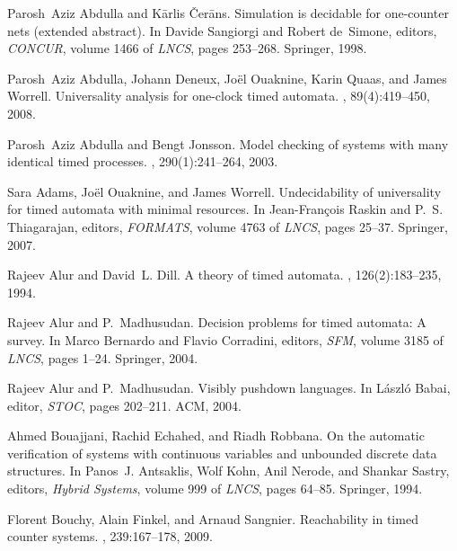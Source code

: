 \documentclass{CSML}
\theoremstyle{plain}\newtheorem{theorem}[thm]{Theorem}
\theoremstyle{plain}\newtheorem{corollary}[thm]{Corollary}
\theoremstyle{plain}\newtheorem{example}[thm]{Example}
\theoremstyle{plain}\newtheorem{lemma}[thm]{Lemma}
\theoremstyle{plain}\newtheorem{remark}[thm]{Remark}
\begin{document}
\begin{thebibliography}{Kos97}

Parosh~Aziz Abdulla and K\={a}rlis \v{C}er\={a}ns.
\newblock Simulation is decidable for one-counter nets (extended abstract).
\newblock In Davide Sangiorgi and Robert de~Simone, editors, {\em CONCUR},
  volume 1466 of {\em LNCS}, pages 253--268. Springer, 1998.

Parosh~Aziz Abdulla, Johann Deneux, Jo{\"e}l Ouaknine, Karin Quaas, and James
  Worrell.
\newblock Universality analysis for one-clock timed automata.
, 89(4):419--450, 2008.



Parosh~Aziz Abdulla and Bengt Jonsson.
\newblock Model checking of systems with many identical timed processes.
, 290(1):241--264, 2003.




Sara Adams, Jo{\"e}l Ouaknine, and James Worrell.
\newblock Undecidability of universality for timed automata with minimal
  resources.
\newblock In Jean-Fran\c{c}ois Raskin and P.~S. Thiagarajan, editors, {\em
  FORMATS}, volume 4763 of {\em LNCS}, pages 25--37. Springer, 2007.

Rajeev Alur and David~L. Dill.
\newblock A theory of timed automata.
, 126(2):183--235, 1994.

Rajeev Alur and P.~Madhusudan.
\newblock Decision problems for timed automata: A survey.
\newblock In Marco Bernardo and Flavio Corradini, editors, {\em SFM}, volume
  3185 of {\em LNCS}, pages 1--24. Springer, 2004.

Rajeev Alur and P.~Madhusudan.
\newblock Visibly pushdown languages.
\newblock In L{\'a}szl{\'o} Babai, editor, {\em STOC}, pages 202--211. ACM,
  2004.

Ahmed Bouajjani, Rachid Echahed, and Riadh Robbana.
\newblock On the automatic verification of systems with continuous variables
  and unbounded discrete data structures.
\newblock In Panos~J. Antsaklis, Wolf Kohn, Anil Nerode, and Shankar Sastry,
  editors, {\em Hybrid Systems}, volume 999 of {\em LNCS}, pages 64--85.
  Springer, 1994.

Florent Bouchy, Alain Finkel, and Arnaud Sangnier.
\newblock Reachability in timed counter systems.
, 239:167--178, 2009.


\end{thebibliography}
\end{document}
